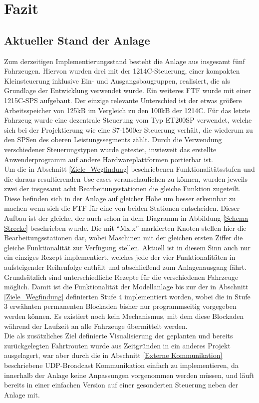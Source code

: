 \chapter{Fazit}

\section{Aktueller Stand der Anlage}
	\label{Stand}
	Zum derzeitigen Implementierungsstand besteht die Anlage aus insgesamt fünf Fahrzeugen. Hiervon wurden drei mit der 1214C-Steuerung, einer kompakten Kleinsteuerung inklusive Ein- und Ausgangsbaugruppen, realisiert, die als Grundlage der Entwicklung verwendet wurde. Ein weiteres \ac{FTF} wurde mit einer 1215C-\ac{SPS} aufgebaut. Der einzige relevante Unterschied ist der etwas größere Arbeitsspeicher von 125kB im Vergleich zu den 100kB der 1214C. Für das letzte Fahrzeug wurde eine dezentrale Steuerung vom Typ ET200SP verwendet, welche sich bei der Projektierung wie eine S7-1500er Steuerung verhält, die wiederum zu den \ac{SPS}en des oberen Leistungssegments zählt. Durch die Verwendung verschiedener Steuerungstypen wurde getestet, inwieweit das erstellte Anwenderprogramm auf andere Hardwareplattformen portierbar ist. 
	\\[4pt]
	Um die in Abschnitt \ref{Ziele_Wegfindung} beschriebenen Funktionalitätsstufen und die daraus resultierenden Use-cases veranschaulichen zu können, wurden jeweils zwei der insgesamt acht Bearbeitungsstationen die gleiche Funktion zugeteilt. Diese befinden sich in der Anlage auf gleicher Höhe um besser erkennbar zu machen wenn sich die \ac{FTF} für eine von beiden Stationen entscheiden. Dieser Aufbau ist der gleiche, der auch schon in dem Diagramm in Abbildung \ref{Schema Strecke} beschrieben wurde. Die mit "`Mx.x"' markierten Knoten stellen hier die Bearbeitungsstationen dar, wobei Maschinen mit der gleichen ersten Ziffer die gleiche Funktionalität zur Verfügung stellen. Aktuell ist in diesem Sinn auch nur ein einziges Rezept implementiert, welches jede der vier Funktionalitäten in aufsteigender Reihenfolge enthält und abschließend zum Anlagenausgang fährt. Grundsätzlich sind unterschiedliche Rezepte für die verschiedenen Fahrzeuge möglich. Damit ist die Funktionalität der Modellanlage bis zur der in Abschnitt \ref{Ziele_Wegfindung} definierten Stufe 4 implementiert worden, wobei die in Stufe 3 erwähnten permanenten Blockaden bisher nur programmseitig vorgegeben werden können. Es existiert noch kein Mechanismus, mit dem diese Blockaden während der Laufzeit an alle Fahrzeuge übermittelt werden.
	\\[4pt]
	Die als zusätzliches Ziel definierte Visualisierung der geplanten und bereits zurückgelegten Fahrtrouten wurde aus Zeitgründen in ein anderes Projekt ausgelagert, war aber durch die in Abschnitt \ref{Externe Kommunikation} beschriebene \ac{UDP}-Broadcast Kommunikation einfach zu implementieren, da innerhalb der Anlage keine Anpassungen vorgenommen werden müssen, und läuft bereits in einer einfachen Version auf einer gesonderten Steuerung neben der Anlage mit.
	
